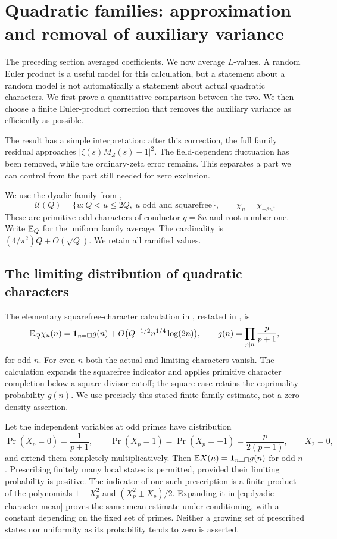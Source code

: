 \section{Quadratic families: approximation and removal of auxiliary variance}\label{sec:residuals}

The preceding section averaged coefficients. We now average $L$-values. A random Euler product is a useful model for this calculation, but a statement about a random model is not automatically a statement about actual quadratic characters. We first prove a quantitative comparison between the two. We then choose a finite Euler-product correction that removes the auxiliary variance as efficiently as possible.

The result has a simple interpretation: after this correction, the full family residual approaches $|\zeta(s)M_Z(s)-1|^2$. The field-dependent fluctuation has been removed, while the ordinary-zeta error remains. This separates a part we can control from the part still needed for zero exclusion.

We use the dyadic family from \cite{R1001,R1003},
\[
 \mathcal U(Q)=\{u:Q<u\le2Q,\ u\text{ odd and squarefree}\},
 \qquad \chi_u=\chi_{-8u}.
\]
These are primitive odd characters of conductor $q=8u$ and root number one. Write $\mathbb E_Q$ for the uniform family average. The cardinality is $(4/\pi^2)Q+O(\sqrt Q)$. We retain all ramified values.

\subsection{The limiting distribution of quadratic characters}
The elementary squarefree-character calculation in \cite[shared proof]{R1001}, restated in \cite[arithmetic proof, (1.1)]{R1003}, is
\begin{equation}\label{eq:dyadic-character-mean}
 \mathbb E_Q\chi_u(n)=\mathbf 1_{n=\square}g(n)
   +O\bigl(Q^{-1/2}n^{1/4}\log(2n)\bigr),\qquad
 g(n)=\prod_{p\mid n}\frac p{p+1},
\end{equation}
for odd $n$. For even $n$ both the actual and limiting characters vanish. The calculation expands the squarefree indicator and applies primitive character completion below a square-divisor cutoff; the square case retains the coprimality probability $g(n)$. We use precisely this stated finite-family estimate, not a zero-density assertion.

Let the independent variables at odd primes have distribution
\begin{equation}\label{eq:local-law}
 \Pr(X_p=0)=\frac1{p+1},\qquad
 \Pr(X_p=1)=\Pr(X_p=-1)=\frac p{2(p+1)},\qquad X_2=0,
\end{equation}
and extend them completely multiplicatively. Then $\mathbb E X(n)=\mathbf 1_{n=\square}g(n)$ for odd $n$. Prescribing finitely many local states is permitted, provided their limiting probability is positive. The indicator of one such prescription is a finite product of the polynomials $1-X_p^2$ and $(X_p^2\pm X_p)/2$. Expanding it in \eqref{eq:dyadic-character-mean} proves the same mean estimate under conditioning, with a constant depending on the fixed set of primes. Neither a growing set of prescribed states nor uniformity as its probability tends to zero is asserted.

